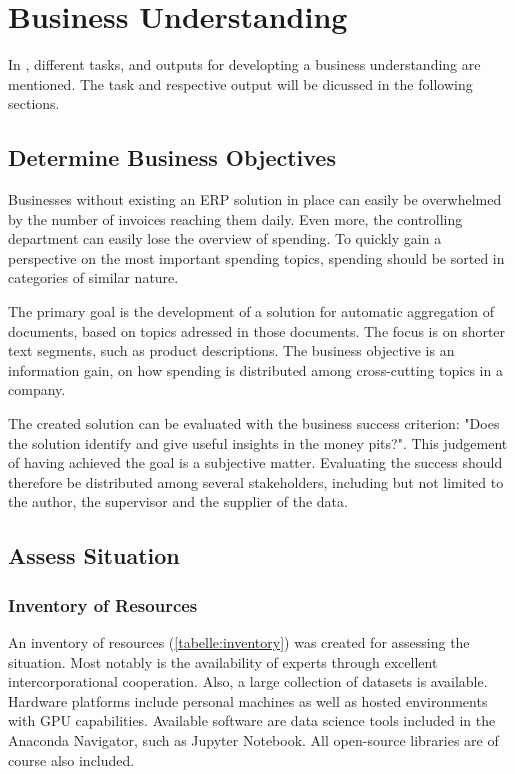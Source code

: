 \chapter{Business Understanding}
In \cite{CRISPDM2000}, different tasks, and outputs for developting a business understanding are mentioned. The task and respective output will be dicussed in the following sections.

\section{Determine Business Objectives}
Businesses without existing an \ac{ERP} solution in place can easily be overwhelmed by the number of invoices reaching them daily. Even more, the controlling department can easily lose the overview of spending. To quickly gain a perspective on the most important spending topics, spending should be sorted in categories of similar nature.

The primary goal is the development of a solution for automatic aggregation of documents, based on topics adressed in those documents. The focus is on shorter text segments, such as product descriptions. The business objective is an information gain, on how spending is distributed among cross-cutting topics in a company.

The created solution can be evaluated with the business success criterion: "Does the solution identify and give useful insights in the money pits?". This judgement of having achieved the goal is a subjective matter. Evaluating the success should therefore be distributed among several stakeholders, including but not limited to the author, the supervisor and the supplier of the data.


\section{Assess Situation}

\subsection{Inventory of Resources}
An inventory of resources (\ref{tabelle:inventory}) was created for assessing the situation. Most notably is the availability of experts through excellent intercorporational cooperation. Also, a large collection of datasets is available. Hardware platforms include personal machines as well as hosted environments with GPU capabilities. Available software are data science tools included in the Anaconda Navigator, such as Jupyter Notebook. All open-source libraries are of course also included.

